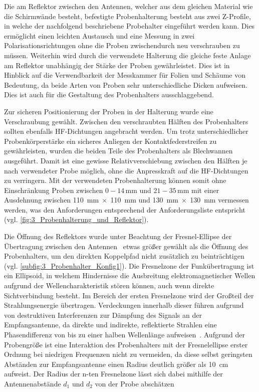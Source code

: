 Die am Reflektor zwischen den Antennen, welcher aus dem gleichen Material wie die Schirmwände besteht, befestigte Probenhalterung besteht aus zwei Z-Profile, in welche der nachfolgend beschriebene Probehalter eingeführt werden kann. Dies ermöglicht einen leichten Austausch und eine Messung in zwei Polarisationsrichtungen ohne die Proben zwischendurch neu verschrauben zu müssen. Weiterhin wird durch die verwendete Halterung die gleiche feste Anlage am Reflektor unabhängig der Stärke der Proben gewährleistet. Dies ist in Hinblick auf die Verwendbarkeit der Messkammer für Folien und Schäume von Bedeutung, da beide Arten von Proben sehr unterschiedliche Dicken aufweisen. Dies ist auch für die Gestaltung des Probenhalters ausschlaggebend.
\par
\vspace{\linespace}
Zur sicheren Positionierung der Proben in der Halterung wurde eine Verschraubung gewählt. Zwischen den verschraubten Hälften des Probenhalters sollten ebenfalls HF-Dichtungen angebracht werden. Um trotz unterschiedlicher Probenkörperstärke ein sicheres Anliegen der Kontaktfederstreifen zu gewährleisten, wurden die beiden Teile des Probenhalters als Blechwannen ausgeführt. Damit ist eine gewisse Relativverschiebung zwischen den Hälften je nach verwendeter Probe möglich, ohne die Anpresskraft auf die HF-Dichtungen zu verringern. Mit der verwendeten Probenhalterung können somit ohne Einschränkung Proben zwischen $0-14\,\si{\milli\meter}$ und $21-35\,\si{\milli\meter}$ mit einer Ausdehnung zwischen \SI{110}{\milli\meter}$\; \times \;$\SI{110}{\milli\meter} und \SI{130}{\milli\meter}$\; \times \;$\SI{130}{\milli\meter} vermessen werden, was den Anforderungen entsprechend der Anforderungsliste entspricht (vgl. \Abb\ref{fig:3_Probenhalterung_und_Reflektor}). 
\par
\vspace{\linespace}
Die Öffnung des Reflektors wurde unter Beachtung der Fresnel-Ellipse der Übertragung zwischen den Antennen~\cite{Taschenbuch_HF-Technik} etwas größer gewählt als die Öffnung des Probenhalters, um den direkten Koppelpfad nicht zusätzlich zu beinträchtigen (vgl. \Abb\ref{subfig:3_Probenhalter_Konfig1}). Die Fresnelzone der Funkübertragung ist ein Ellipsoid, in welchem Hindernisse die Ausbreitung elektromagnetischer Wellen aufgrund der Wellencharakteristik stören können, auch wenn direkte Sichtverbindung besteht. Im Bereich der ersten Fresnelzone wird der Großteil der Strahlungsenergie übertragen. Verdeckungen innerhalb dieser führen aufgrund von destruktiven Interferenzen zur Dämpfung des Signals an der Empfangsantenne, da direkte und indirekte, reflektierte Strahlen eine Phasendifferenz von bis zu einer halben Wellenlänge aufweisen~\cite{Advanced_Elecronic_Communication_Systems}. Aufgrund der Probengröße ist eine Interaktion des Probenhalters mit der Fresnelellipse erster Ordnung bei niedrigen Frequenzen nicht zu vermeiden, da diese selbst geringsten Abständen zur Empfangsantenne einen Radius deutlich größer als \SI{10}{\centi\meter} aufweist. Der Radius der n-ten Fresnelzone lässt sich dabei mithilfe der Antennenabstände $d_1$ und $d_2$ von der Probe abschätzen~\cite{Taschenbuch_HF-Technik}

